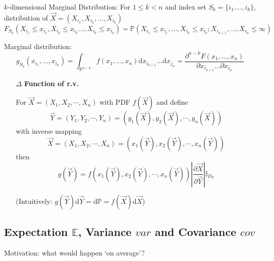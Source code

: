     $k$-dimensional Marginal Distribution: For $1\leq k<n$ and index set $S_k=\{i_1.\ldots,i_k\}$, distribution of $\vec{X}=(X_{i_1},X_{i_2},\ldots,X_{i_k})$
    \begin{equation}F_{S_k}(X_{i_1}\leq x_{i_1},X_{i_2}\leq x_{i_2}\ldots,X_{i_k}\leq x_{i_k})=\mathbb{P}(X_{i_1}\leq x_{i_1},\ldots,X_{i_k}\leq x_{i_k};X_{i_{k+1}},\ldots,X_{i_n}\leq\infty)\end{equation}

    Marginal distribution: 
    \begin{equation}
        g_{S_k}(x_{i_1},\ldots,x_{i_k})=\int_{\mathbb{R}^{n-k}}f(x_1,\ldots,x_n)\mathrm{d}x_{i_{k+1}}\ldots\mathrm{d}x_{j_n}=\dfrac{\partial^{n-k}F(x_1,\ldots,x_n)}{\partial x_{i_{k+1}}\ldots\partial x_{i_n}}
    \end{equation}


    \begin{itemize}
        \item[$\Delta$] \textbf{Function of r.v.}
        
        For $\vec{X}=(X_1,X_2,\cdots,X_n)$ with PDF $f(\vec{X})$ and define 
        \begin{equation}    
            \vec{Y}=(Y_1,Y_2,\cdots,Y_n)=\left(y_1(\vec{X}),y_2(\vec{X}),\cdots,y_n(\vec{X})\right)
        \end{equation}
        with inverse mapping
        \begin{equation}    
            \vec{X}=(X_1,X_2,\cdots,X_n)=\left(x_1(\vec{Y}),x_2(\vec{Y}),\cdots,x_n(\vec{Y})\right)
        \end{equation}
        then
        \begin{equation}    
            g(\vec{Y})= f\left(x_1(\vec{Y}),x_2(\vec{Y}),\cdots,x_n(\vec{Y})\right)\left|\frac{\partial \vec{X}}{\partial\vec{Y}}\right|\mathbb{I}_{D_Y}
        \end{equation}

        (Intuitively: $g(\vec{Y} )\mathrm{d}\vec{Y}=\mathrm{d}\mathbb{P}=f(\vec{X})\mathrm{d}\vec{X}$)
    \end{itemize}



    




\subsection{Expectation $\mathbb{E}$, Variance $var$ and Covariance $cov$}
Motivation: what would happen `on average'?

